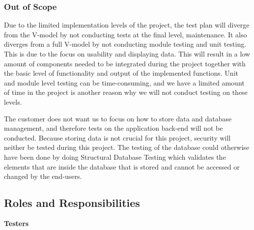 \subsubsection{Out of Scope} 
Due to the limited implementation levels of the project, the test plan will diverge from the V-model by not conducting tests at the final level, maintenance. It also diverges from a full V-model by not conducting module testing and unit testing. This is due to the focus on usability and displaying data. This will result in a low amount of components needed to be integrated during the project together with the basic level of functionality and output of the implemented functions. Unit and module level testing can be time-consuming, and we have a limited amount of time in the project is another reason why we will not conduct testing on these levels. \newline

\noindent  The customer does not want us to focus on how to store data and database management, and therefore tests on the application back-end will not be conducted. Because storing data is not crucial for this project, security will neither be tested during this project. The testing of the database could otherwise have been done by doing Structural Database Testing which validates the elements that are inside the database that is stored and cannot be accessed or changed by the end-users. 


\subsection{Roles and Responsibilities}

\textbf{Testers}\newline

